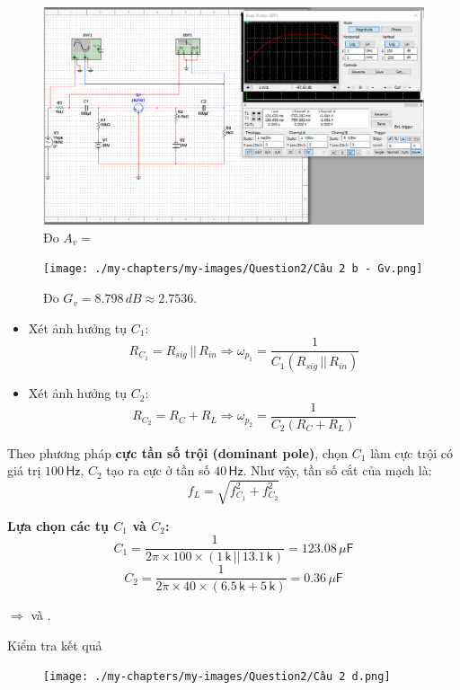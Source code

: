 \begin{figure}[H]
	\centering
	\includegraphics[width=\linewidth]{./my-chapters/my-images/Question2/Câu 2 b - Sóng và Av.png}
	\caption{Đo $A_{v} = $}
\end{figure}

\begin{figure}[H]
	\centering
	\texttt{[image: ./my-chapters/my-images/Question2/Câu 2 b - Gv.png]}
	\caption{Đo $G_{v} = 8.798\, dB \approx 2.7536$.}
\end{figure}


\begin{itemize}[label=-]
	\item Xét ảnh hưởng tụ $C_{1}$: 
	\[
	R_{C_{1}} = R_{sig} \,||\, R_{in}
	\Longrightarrow 
	\omega_{p_{1}} = \frac{1}{C_{1}\left(R_{sig} \,||\, R_{in}\right)}
	\]
	
	\item Xét ảnh hưởng tụ $C_{2}$: 
	\[
	R_{C_{2}} = R_{C} + R_{L}
	\Longrightarrow 
	\omega_{p_{2}} = \frac{1}{C_{2}\left(R_{C} + R_{L}\right)}
	\]
\end{itemize}

Theo phương pháp \textbf{cực tần số trội (dominant pole)}, chọn $C_{1}$ làm cực trội có giá trị $100\,\textsf{Hz}$, 
$C_{2}$ tạo ra cực ở tần số $40\,\textsf{Hz}$.  
Như vậy, tần số cắt của mạch là:
\[
f_{L} = \sqrt{f_{C_{1}}^{2} + f_{C_{2}}^{2}}
\]

\textbf{Lựa chọn các tụ $C_{1}$ và $C_{2}$:}
\[
C_{1} = \frac{1}{2\pi \times 100 \times (1\,\textsf{k}\,||\,13.1\,\textsf{k})}
= 123.08\,\mu\textsf{F}
\]
\[
C_{2} = \frac{1}{2\pi \times 40 \times (6.5\,\textsf{k} + 5\,\textsf{k})}
= 0.36\,\mu\textsf{F}
\]

$\Rightarrow$  và .

Kiểm tra kết quả

\begin{figure}[H]
	\centering
	\texttt{[image: ./my-chapters/my-images/Question2/Câu 2 d.png]}
\end{figure}
